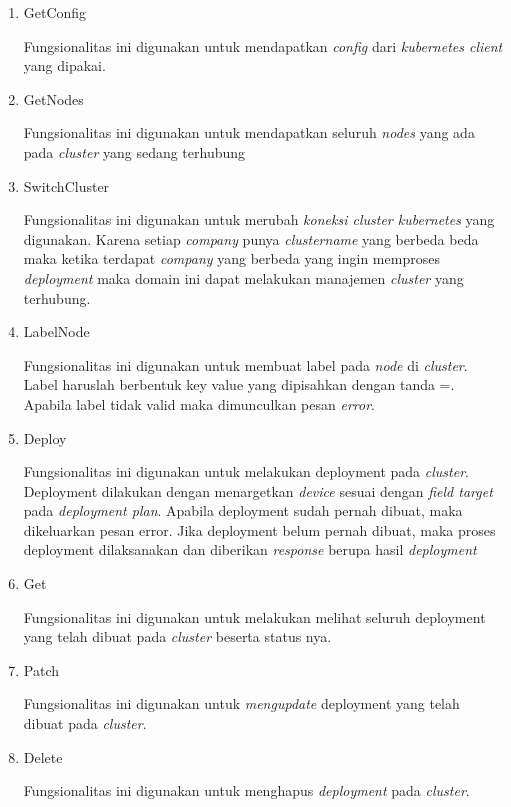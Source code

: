\begin{enumerate}
  \item GetConfig

        Fungsionalitas ini digunakan untuk mendapatkan \textit{config} dari \textit{kubernetes client} yang dipakai.

  \item GetNodes

        Fungsionalitas ini digunakan untuk mendapatkan seluruh \textit{nodes} yang ada pada \textit{cluster} yang sedang terhubung

  \item SwitchCluster

        Fungsionalitas ini digunakan untuk merubah \textit{koneksi cluster kubernetes} yang digunakan. Karena setiap \textit{company} punya \textit{cluster\textunderscore name} yang berbeda beda maka ketika terdapat \textit{company} yang berbeda yang ingin memproses \textit{deployment} maka domain ini dapat melakukan manajemen \textit{cluster} yang terhubung.

  \item LabelNode

        Fungsionalitas ini digunakan untuk membuat label pada \textit{node} di \textit{cluster}. Label haruslah berbentuk key value yang dipisahkan dengan tanda =. Apabila label tidak valid maka dimunculkan pesan \textit{error}.

  \item Deploy

        Fungsionalitas ini digunakan untuk melakukan deployment pada \textit{cluster}. Deployment dilakukan dengan menargetkan \textit{device} sesuai dengan \textit{field target} pada \textit{deployment plan}. Apabila deployment sudah pernah dibuat, maka dikeluarkan pesan error. Jika deployment belum pernah dibuat, maka proses deployment dilaksanakan dan diberikan \textit{response} berupa hasil \textit{deployment}

  \item Get

        Fungsionalitas ini digunakan untuk melakukan melihat seluruh deployment yang telah dibuat pada \textit{cluster} beserta status nya.



  \item Patch

        Fungsionalitas ini digunakan untuk \textit{mengupdate} deployment yang telah dibuat pada \textit{cluster}.

  \item Delete

        Fungsionalitas ini digunakan untuk menghapus \textit{deployment} pada \textit{cluster}.

\end{enumerate}